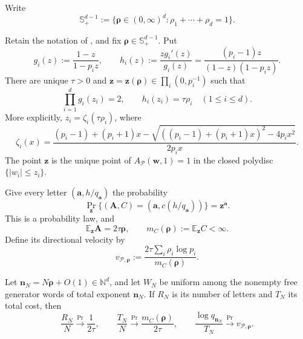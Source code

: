 Write
\[
 \mathbb S_{+}^{d-1}:=
 \{\boldsymbol\rho\in(0,\infty)^d:
   \rho_1+\cdots+\rho_d=1\}.
\]

\begin{theorem}
\label{thm:prime-support-directional-quenched}
Retain the notation of , and fix
\(\boldsymbol\rho\in\mathbb S_{+}^{d-1}\).  Put
\[
 g_i(z):=\frac{1-z}{1-p_i z},
 \qquad
 h_i(z):=\frac{z g_i'(z)}{g_i(z)}
 =\frac{(p_i-1)z}{(1-z)(1-p_i z)}.
\]
There are unique \(\tau>0\) and
\(\mathbf z=\mathbf z(\boldsymbol\rho)\in
\prod_i(0,p_i^{-1})\) such that
\begin{equation}
 \prod_{i=1}^d g_i(z_i)=2,
 \qquad h_i(z_i)=\tau\rho_i\quad(1\le i\le d).
 \label{eq:prime-support-directional-saddle}
\end{equation}
More explicitly, \(z_i=\zeta_i(\tau\rho_i)\), where
\begin{equation}
 \zeta_i(x)=
 \frac{(p_i-1)+(p_i+1)x-
  \sqrt{((p_i-1)+(p_i+1)x)^2-4p_i x^2}}
 {2p_i x}.
 \label{eq:prime-support-correct-inverse}
\end{equation}
The point \(\mathbf z\) is the unique point of
\(A_{\mathcal P}(\mathbf w,1)=1\) in the closed polydisc
\(\{|w_i|\le z_i\}\).

Give every letter \((\mathbf a,h/q_{\mathbf a})\) the probability
\begin{equation}
 \Pr_{\mathbf z}\{(\mathbf A,C)=
  (\mathbf a,c(h/q_{\mathbf a}))\}=\mathbf z^{\mathbf a}.
 \label{eq:prime-support-directional-letter-law}
\end{equation}
This is a probability law, and
\[
 \mathbb E_{\mathbf z}\mathbf A=2\tau\boldsymbol\rho,
 \qquad m_C(\boldsymbol\rho):=\mathbb E_{\mathbf z}C<\infty.
\]
Define its directional velocity by
\begin{equation}
 v_{\mathcal P,\boldsymbol\rho}:=
 \frac{2\tau\sum_i\rho_i\log p_i}{m_C(\boldsymbol\rho)}.
 \label{eq:prime-support-directional-velocity}
\end{equation}

Let \(\mathbf n_N=N\boldsymbol\rho+O(1)\in\mathbb N^d\), and let
\(W_N\) be uniform among the nonempty free generator words of total exponent
\(\mathbf n_N\).  If \(R_N\) is its number of letters and \(T_N\) its
total cost, then
\begin{equation}
 \frac{R_N}{N}\xrightarrow{\Pr}\frac1{2\tau},
 \qquad
 \frac{T_N}{N}\xrightarrow{\Pr}\frac{m_C(\boldsymbol\rho)}{2\tau},
 \qquad
 \frac{\log q_{\mathbf n_N}}{T_N}
 \xrightarrow{\Pr}v_{\mathcal P,\boldsymbol\rho}.
 \label{eq:prime-support-directional-free-law}
\end{equation}


\end{theorem}
